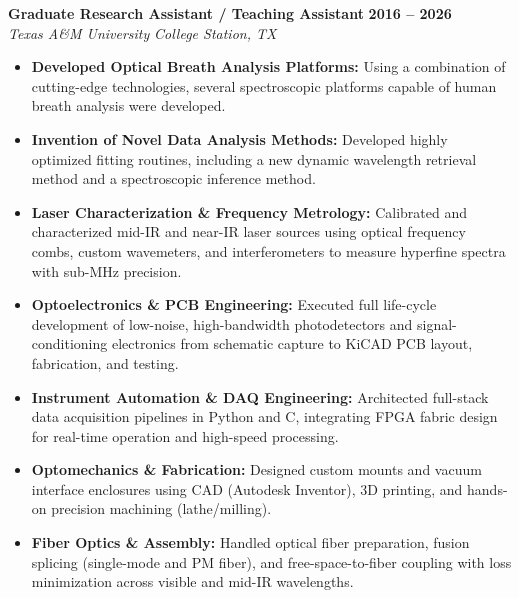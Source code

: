 \documentclass[a4paper,11pt]{extarticle}
\newcommand{\resumeentryC}[4]{
	\noindent\textbf{#2} \hfill \textbf{#1}\\
	\textit{#3} \hfill \textit{#4}
}
\begin{document}
	\resumeentryC{2016 -- 2026}{Graduate Research Assistant / Teaching Assistant}{Texas A\&M University}{College Station, TX}
	\begin{itemize}[leftmargin=1.2em, itemsep=0.2em]
		\item \textbf{Developed Optical Breath Analysis Platforms:} Using a combination of cutting-edge technologies, several spectroscopic platforms capable of human breath analysis were developed.
		\item \textbf{Invention of Novel Data Analysis Methods:} Developed highly optimized fitting routines, including a new dynamic wavelength retrieval method and a spectroscopic inference method.
		\item \textbf{Laser Characterization \& Frequency Metrology:} Calibrated and characterized mid-IR and near-IR laser sources using optical frequency combs, custom wavemeters, and interferometers to measure hyperfine spectra with sub-MHz precision.
		\item \textbf{Optoelectronics \& PCB Engineering:} Executed full life-cycle development of low-noise, high-bandwidth photodetectors and signal-conditioning electronics from schematic capture to KiCAD PCB layout, fabrication, and testing.
		\item \textbf{Instrument Automation \& DAQ Engineering:} Architected full-stack data acquisition pipelines in Python and C, integrating FPGA fabric design for real-time operation and high-speed processing.
		\item \textbf{Optomechanics \& Fabrication:} Designed custom mounts and vacuum interface enclosures using CAD (Autodesk Inventor), 3D printing, and hands-on precision machining (lathe/milling).
		\item \textbf{Fiber Optics \& Assembly:} Handled optical fiber preparation, fusion splicing (single-mode and PM fiber), and free-space-to-fiber coupling with loss minimization across visible and mid-IR wavelengths.
	\end{itemize}
	
\end{document}
